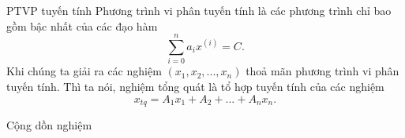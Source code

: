 \begin{frame}{PTVP tuyến tính}
    Phương trình vi phân tuyến tính là các phương trình chỉ bao gồm bậc nhất của các đạo hàm
    \begin{equation}
        \sum_{i=0}^n a_i x ^{(i)} = C.
        \label{eq:1.2_1}
    \end{equation}
    Khi chúng ta giải ra các nghiệm \((x_1, x_2,..., x_n)\) thoả mãn phương trình vi phân tuyến tính. Thì ta nói, nghiệm tổng quát là tổ hợp tuyến tính của các nghiệm
    \begin{equation}
        x_{tq} = A_1 x_1 + A_2 + ... + A_n x_n.
        \label{eq:1.2_2}
    \end{equation}
\end{frame}
\begin{frame}{Cộng dồn nghiệm}
\begin{center}
        \resizebox{0.6\linewidth}{!}{}
\end{center}
\end{frame}